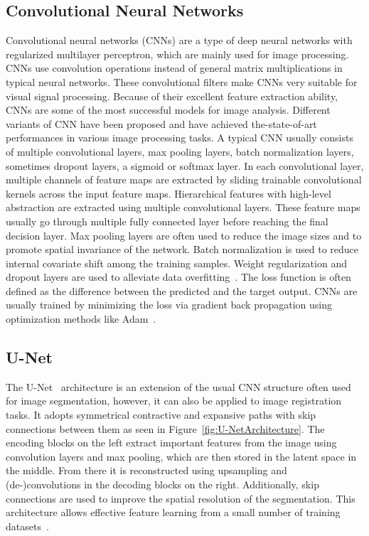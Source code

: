 \documentclass[english,version-2022-01]{uzl-thesis} %
\begin{document}
\subsection{Convolutional Neural Networks} \label{SubSec:CNNs}
Convolutional neural networks (CNNs) are a type of deep neural networks with regularized multilayer perceptron, which are mainly used for image processing. CNNs use convolution operations instead of general matrix multiplications in typical neural networks. These convolutional filters make CNNs very suitable for visual signal processing. Because of their excellent feature extraction ability, CNNs are some of the most successful models for image analysis. Different variants of CNN have been proposed and have achieved the-state-of-art performances in various image processing tasks. A typical CNN usually consists of multiple convolutional layers, max pooling layers, batch normalization layers, sometimes dropout layers, a sigmoid or softmax layer. In each convolutional layer, multiple channels of feature maps are extracted by sliding trainable convolutional kernels across the input feature maps. Hierarchical features with high-level abstraction are extracted using multiple convolutional layers. These feature maps usually go through multiple fully connected layer before reaching the final decision layer. Max pooling layers are often used to reduce the image sizes and to promote spatial invariance of the network. Batch normalization is used to reduce internal covariate shift among the training samples. Weight regularization and dropout layers are used to alleviate data overfitting~\cite{Fu2020}. The loss function is often defined as the difference between the predicted and the target output. CNNs are usually trained by minimizing the loss via gradient back propagation using optimization methods like Adam~\cite{Adam}. %

\subsection{U-Net} \label{SubSec:U-Net}
The U-Net~\cite{U-Net} architecture is an extension of the usual CNN structure often used for image segmentation, however, it can also be applied to image registration tasks. It adopts symmetrical contractive and expansive paths with skip connections between them as seen in Figure~\ref{fig:U-NetArchitecture}. The encoding blocks on the left extract important features from the image using convolution layers and max pooling, which are then stored in the latent space in the middle. From there it is reconstructed using upsampling and (de-)convolutions in the decoding blocks on the right. Additionally, skip connections are used to improve the spatial resolution of the segmentation. This architecture allows effective feature learning from a small number of training datasets~\cite{Fu2020}. 
\end{document}
